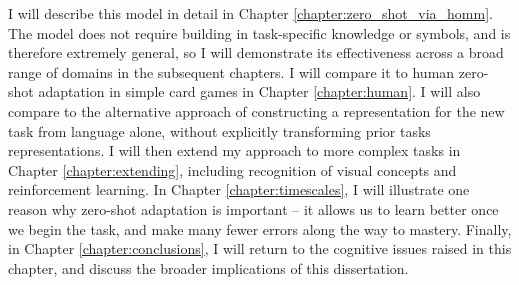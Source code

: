 I will describe this model in detail in Chapter \ref{chapter:zero_shot_via_homm}. The model does not require building in task-specific knowledge or symbols, and is therefore extremely general, so I will demonstrate its effectiveness across a broad range of domains in the subsequent chapters. I will compare it to human zero-shot adaptation in simple card games in Chapter \ref{chapter:human}. I will also compare to the alternative approach of constructing a representation for the new task from language alone, without explicitly transforming prior tasks representations. I will then extend my approach to more complex tasks in Chapter \ref{chapter:extending}, including recognition of visual concepts and reinforcement learning. In Chapter \ref{chapter:timescales}, I will illustrate one reason why zero-shot adaptation is important -- it allows us to learn better once we begin the task, and make many fewer errors along the way to mastery. Finally, in Chapter \ref{chapter:conclusions}, I will return to the cognitive issues raised in this chapter, and discuss the broader implications of this dissertation.\par 


